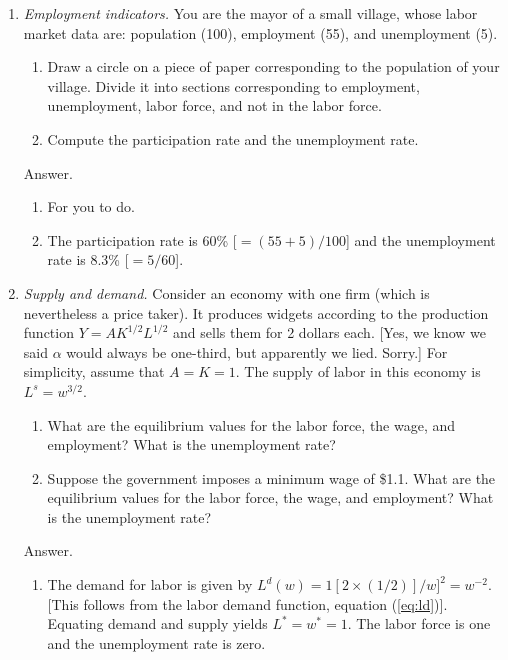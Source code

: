 \documentclass[letterpaper,12pt]{article}
\begin{document}
\begin{enumerate}

\item {\it Employment indicators.\/} 
You are the mayor of a small village, whose
labor market data are: population (100), employment (55), and
unemployment (5).
\begin{enumerate}
\item Draw a circle on a piece of paper corresponding to the
population of your village. Divide it into sections corresponding
to employment, unemployment, labor force, and not in the labor
force.

\item Compute the participation rate and the unemployment rate.
\end{enumerate}

Answer.
\begin{enumerate}
\item For you to do.

\item The participation rate is 60\% [$= (55+5)/100$] and the
unemployment rate is 8.3\% [$= 5/60$].
\end{enumerate}

\item {\it Supply and demand.\/} Consider an economy with one firm (which
is nevertheless a price taker).  It produces widgets according to
the production function $Y = A K^{1/2}L^{1/2}$ and sells them for
2 dollars each.  
[Yes, we know we said $\alpha$ would always be one-third, 
but apparently we lied.  Sorry.]
For simplicity, assume that $A = K = 1$.  The
supply of labor in this economy is $L^{s}=w^{3/2}$.
%
\begin{enumerate}
\item What are the equilibrium values for the labor force, the
wage, and employment? What is the unemployment rate?

\item Suppose the government imposes a minimum wage of \$1.1. What
are the equilibrium values for the labor force, the wage, and
employment? What is the unemployment rate?
\end{enumerate}

Answer.
%
\begin{enumerate}
\item The demand for labor is given by $L^{d}(w) = 1 [ 2 \times
(1/2)]/{w}]^{2} = w^{-2}$.  [This follows from the labor demand
function, equation (\ref{eq:ld})].  Equating demand and supply
yields $L^{*}=w^{*}=1$. The labor force is one and the
unemployment rate is zero.


\end{enumerate}
\end{enumerate}
\end{document}

